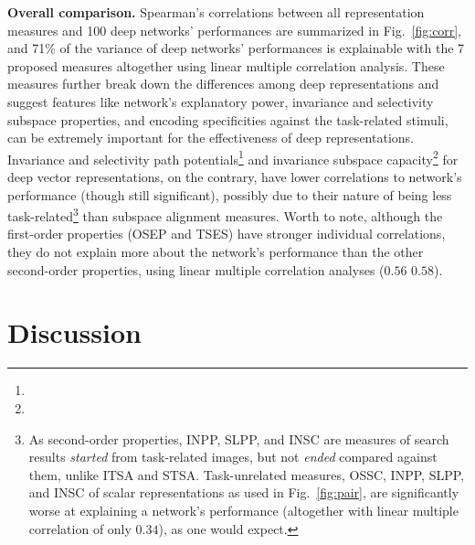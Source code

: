 \documentclass[10pt,twocolumn,letterpaper]{article}
\begin{document}
\newcommand{\expextrinsic}{As second-order properties, INPP, SLPP, and INSC are measures of search results \emph{started} from task-related images, but not \emph{ended} compared against them, unlike ITSA and STSA.
Task-unrelated measures, \ie OSSC, INPP, SLPP, and INSC of scalar representations as used in Fig.~\ref{fig:pair}, are significantly worse at explaining a network's performance (altogether with linear multiple correlation of only $0.34$), as one would expect.
}

{\bf Overall comparison.} Spearman's correlations between all representation measures and 100 deep networks' performances are summarized in Fig.~\ref{fig:corr}, and 71\% of the variance of deep networks' performances is explainable with the 7 proposed measures altogether using linear multiple correlation analysis.
These measures further break down the differences among deep representations and suggest features like network's explanatory power, invariance and selectivity subspace properties, and encoding specificities against the task-related stimuli, can be extremely important for the effectiveness of deep representations.
Invariance and selectivity path potentials\footnote{} and invariance subspace capacity\footnote{\expinsc} for deep vector representations, on the contrary, have lower correlations to network's performance (though still significant), possibly due to their nature of being less task-related\footnote{\expextrinsic} than subspace alignment measures.
Worth to note, although the first-order properties (OSEP and TSES) have stronger individual correlations, they do not explain more about the network's performance than the other second-order properties, using linear multiple correlation analyses ($0.56$ \vs $0.58$).


\section{Discussion}
\end{document}
